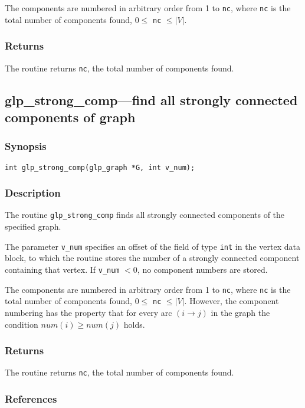 The components are numbered in arbitrary order from 1 to \verb|nc|,
where \verb|nc| is the total number of components found,
$0\leq$ \verb|nc| $\leq|V|$.

\subsubsection*{Returns}

The routine returns \verb|nc|, the total number of components found.

\subsection{glp\_strong\_comp---find all strongly connected components
of graph}

\subsubsection*{Synopsis}

\begin{verbatim}
int glp_strong_comp(glp_graph *G, int v_num);
\end{verbatim}

\subsubsection*{Description}

The routine \verb|glp_strong_comp| finds all strongly connected
components of the specified graph.

The parameter \verb|v_num| specifies an offset of the field of type
\verb|int| in the vertex data block, to which the routine stores the
number of a strongly connected component containing that vertex. If
\verb|v_num| $<0$, no component numbers are stored.

The components are numbered in arbitrary order from 1 to \verb|nc|,
where \verb|nc| is the total number of components found,
$0\leq$ \verb|nc| $\leq|V|$. However, the component numbering has the
property that for every arc $(i\rightarrow j)$ in the graph the
condition $num(i)\geq num(j)$ holds.

\subsubsection*{Returns}

The routine returns \verb|nc|, the total number of components found.

\subsubsection*{References}

